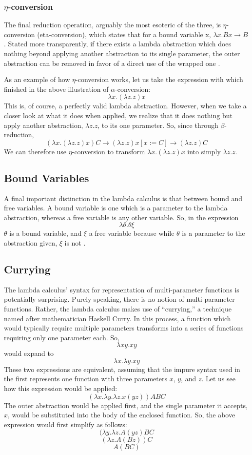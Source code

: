 \documentclass[twocolumn,titlepage,12pt]{article}
\begin{document}
\subsubsection{$\eta$-conversion}
The final reduction operation, arguably the most esoteric of the three, is $\eta$-conversion (eta-conversion), which states that for a bound variable x, $\lambda x.Bx \to B$. Stated more transparently, if there exists a lambda abstraction which does nothing beyond applying another abstraction to its single parameter, the outer abstraction can be removed in favor of a direct use of the wrapped one \cite{etared}.

As an example of how $\eta$-conversion works, let us take the expression with which finished in the above illustration of $\alpha$-conversion:
$$\lambda x.(\lambda z.z)x$$
This is, of course, a perfectly valid lambda abstraction. However, when we take a closer look at what it does when applied, we realize that it does nothing but apply another abstraction, $\lambda z.z$, to its one parameter. So, since through $\beta$-reduction,
$$(\lambda x.(\lambda z.z)x)C\to (\lambda z.z)x[x:=C]\to (\lambda z.z)C$$
We can therefore use $\eta$-conversion to transform $\lambda x.(\lambda z.z)x$ into simply $\lambda z.z$.

\subsection{Bound Variables}
A final important distinction in the lambda calculus is that between bound and free variables. A bound variable is one which is a parameter to the lambda abstraction, whereas a free variable is any other variable. So, in the expression
$$\lambda \theta.\theta \xi$$
$\theta$ is a bound variable, and $\xi$ a free variable because while $\theta$ is a parameter to the abstraction given, $\xi$ is not \cite{stanfordlc}.

\subsection{Currying}
The lambda calculus' syntax for representation of multi-parameter functions is potentially surprising. Purely speaking, there is no notion of multi-parameter functions. Rather, the lambda calculus makes use of ``currying,'' a technique named after mathematician Haskell Curry. In this process, a function which would typically require multiple parameters transforms into a series of functions requiring only one parameter each. So,
$$\lambda xy.xy$$
would expand to
$$\lambda x.\lambda y.xy$$
These two expressions are equivalent, assuming that the impure syntax used in the first represents one function with three parameters $x$, $y$, and $z$. Let us see how this expression would be applied:
$$(\lambda x.\lambda y.\lambda z.x(yz))ABC$$
The outer abstraction would be applied first, and the single parameter it accepts, $x$, would be substituted into the body of the enclosed function. So, the above expression would first simplify as follows:
$$(\lambda y.\lambda z.A(yz)BC$$
$$(\lambda z.A(Bz))C$$
$$A(BC)$$
\end{document}
